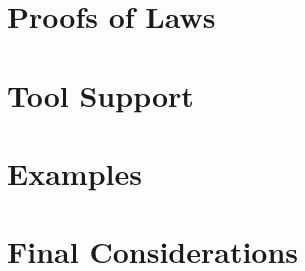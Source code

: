 \section{Proofs of Laws}
\label{proofs-of-laws-section}


\section{Tool Support}
\label{tool-support-section}


\section{Examples}
\label{examples-section}


\section{Final Considerations}
\label{evaluation-final-considerations-section}